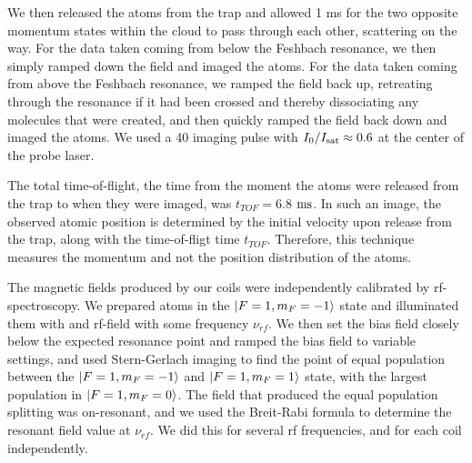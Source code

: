 \documentclass[12pt]{iopart}
\begin{document}
\par We then released the atoms from the trap and allowed 1 ms for the two opposite momentum states within the cloud to pass through each other, scattering on the way. For the data taken coming from below the Feshbach resonance, we then simply ramped down the field and imaged the atoms. For the data taken coming from above the Feshbach resonance, we ramped the field back up, retreating through the resonance if it had been crossed and thereby dissociating any molecules that were created, and then quickly ramped the field back down and imaged the atoms. We used a 40 \us{} imaging pulse with $I_0/I_{\rm{sat}}\approx 0.6$ at the center of the probe laser. 
\par The total time-of-flight, the time from the moment the atoms were released from the trap to when they were imaged, was $t_{TOF}=6.8$ $\rm{ms}$. In such an image, the observed atomic position is determined by the initial velocity upon release from the trap, along with the time-of-fligt time $t_{TOF}$. Therefore, this technique measures the momentum and not the position distribution of the atoms. 
\par The magnetic fields produced by our coils were independently calibrated by rf-spectroscopy. We prepared \Rb{} atoms in the $\mathinner{|{F=1, m_F=-1}\rangle}$ state and illuminated them with and rf-field with some frequency $\nu_{rf}$. We then set the bias field closely below the expected resonance point and ramped the bias field to variable settings, and used Stern-Gerlach imaging to find the point of equal population between the $\mathinner{|{F=1, m_F=-1}\rangle}$  and $\mathinner{|{F=1, m_F=1}\rangle}$ state, with the largest population in $\mathinner{|{F=1, m_F=0}\rangle}$. The field that produced the equal population splitting was on-resonant, and we used the Breit-Rabi formula to determine the resonant field value at $\nu_{rf}$. We did this for several rf frequencies, and for each coil independently. 
\end{document}
